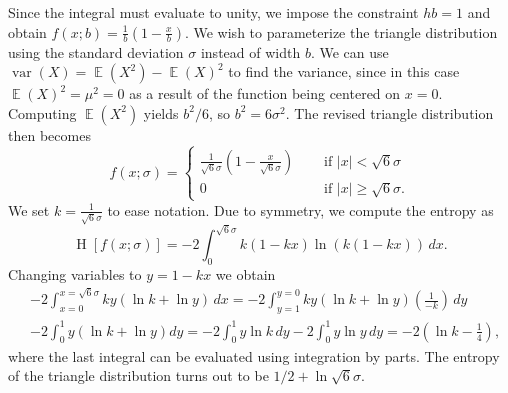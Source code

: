 \documentclass[12pt, a4paper]{article}
\newcommand{\abs}[1]{\left\lvert#1\right\rvert}
\DeclareMathOperator{\E}{\mathbb{E}}
\DeclareMathOperator{\var}{\operatorname{var}}
\renewcommand{\H}{\operatorname{H}}
\begin{document}
Since the integral must evaluate to unity, we impose the constraint $hb = 1$ and obtain $f(x;b) = \frac{1}{b} \left( 1- \frac{x}{b}\right)$.
We wish to parameterize the triangle distribution using the standard deviation $\sigma$ instead of width $b$.
We can use $\var(X) = \E(X^2) - \E(X)^2$ to find the variance, since in this case $\E(X)^2 = \mu^2 = 0$ as a result of the function being centered on $x=0$.
Computing $\E(X^2)$ yields $b^2 / 6$, so $b^2 = 6 \sigma^2$.
The revised triangle distribution then becomes
\begin{equation*}
f(x; \sigma) = \begin{cases}
\frac{1}{\sqrt{6} \sigma} \left(1 - \frac{x}{\sqrt{6} \sigma}\right) &\quad \text{ if } \abs{x} < \sqrt{6} \sigma \\
0 &\quad \text{ if } \abs{x} \geq \sqrt{6} \sigma .
\end{cases}
\end{equation*}
We set $k = \frac{1}{\sqrt{6} \sigma}$ to ease notation.
Due to symmetry, we compute the entropy as 
\begin{equation*}
	\H\left[f(x; \sigma)\right] = - 2 \int_{0}^{\sqrt{6} \sigma} k \left(1 - kx\right) \ln \left( k \left(1 - k x \right) \right) \, dx.
\end{equation*}
Changing variables to $y = 1 - kx$ we obtain
\begin{align*}
& - 2 \int_{x=0}^{x=\sqrt{6} \sigma} k y  \left( \ln k + \ln y \right) \, dx = - 2 \int_{y = 1}^{y = 0} k y  \left( \ln k + \ln y \right) \left(\frac{1}{-k}\right) \, dy \\
& - 2 \int_{0}^{1} y \left( \ln k + \ln y \right) dy = - 2 \int_{0}^{1} y \ln k \, dy - 2 \int_{0}^{1} y  \ln y \, dy = -2 \left( \ln k - \frac{1}{4}\right),
\end{align*}
where the last integral can be evaluated using integration by parts.
The entropy of the triangle distribution turns out to be $1/2 + \ln \sqrt{6} \sigma$.
\end{document}

